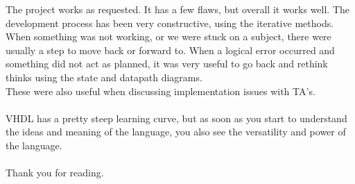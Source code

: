 The project works as requested. It has a few flaws, but overall it works well. The development process has been very constructive, using the iterative methods. When something was not working, or we were stuck on a subject, there were usually a step to move back or forward to. When a logical error occurred and something did not act as planned, it was very useful to go back and rethink thinks using the state and datapath diagrams.\\
These were also useful when discussing implementation issues with TA's.\\
\\
VHDL has a pretty steep learning curve, but as soon as you start to understand the ideas and meaning of the language, you also see the versatility and power of the language.\\
\\
Thank you for reading.